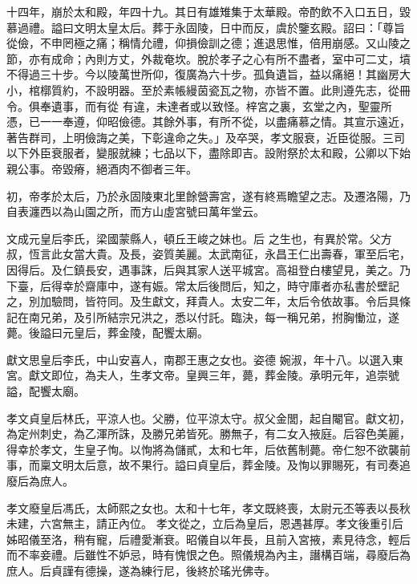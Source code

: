 \begin{pinyinscope}
 十四年，崩於太和殿，年四十九。其日有雄雉集于太華殿。帝酌飲不入口五日，毀慕過禮。謚曰文明太皇太后。葬于永固陵，日中而反，虞於鑒玄殿。詔曰：「尊旨從儉，不申罔極之痛；稱情允禮，仰損儉訓之德；進退思惟，倍用崩感。又山陵之節，亦有成命；內則方丈，外裁奄坎。脫於孝子之心有所不盡者，室中可二丈，墳不得過三十步。今以陵萬世所仰，復廣為六十步。孤負遺旨，益以痛絕！其幽房大小，棺槨質約，不設明器。至於素帳縵茵瓷瓦之物，亦皆不置。此則遵先志，從冊令。俱奉遺事，而有從
 有違，未達者或以致怪。梓宮之裏，玄堂之內，聖靈所憑，已一一奉遵，仰昭儉德。其餘外事，有所不從，以盡痛慕之情。其宣示遠近，著告群司，上明儉誨之美，下彰違命之失。」及卒哭，孝文服衰，近臣從服。三司以下外臣衰服者，變服就練；七品以下，盡除即吉。設附祭於太和殿，公卿以下始親公事。帝毀瘠，絕酒肉不御者三年。



 初，帝孝於太后，乃於永固陵東北里餘營壽宮，遂有終焉瞻望之志。及遷洛陽，乃自表瀍西以為山園之所，而方山虛宮號曰萬年堂云。



 文成元皇后李氏，梁國蒙縣人，頓丘王峻之妹也。后
 之生也，有異於常。父方叔，恆言此女當大貴。及長，姿質美麗。太武南征，永昌王仁出壽春，軍至后宅，因得后。及仁鎮長安，遇事誅，后與其家人送平城宮。高祖登白樓望見，美之。乃下臺，后得幸於齋庫中，遂有娠。常太后後問后，知之，時守庫者亦私書於壁記之，別加驗問，皆符同。及生獻文，拜貴人。太安二年，太后令依故事。令后具條記在南兄弟，及引所結宗兄洪之，悉以付託。臨決，每一稱兄弟，拊胸慟泣，遂薨。後謚曰元皇后，葬金陵，配饗太廟。



 獻文思皇后李氏，中山安喜人，南郡王惠之女也。姿德
 婉淑，年十八。以選入東宮。獻文即位，為夫人，生孝文帝。皇興三年，薨，葬金陵。承明元年，追崇號謚，配饗太廟。



 孝文貞皇后林氏，平涼人也。父勝，位平涼太守。叔父金閭，起自閹官。獻文初，為定州刺史，為乙渾所誅，及勝兄弟皆死。勝無子，有二女入掖庭。后容色美麗，得幸於孝文，生皇子恂。以恂將為儲貳，太和七年，后依舊制薨。帝仁恕不欲襲前事，而稟文明太后意，故不果行。謚曰貞皇后，葬金陵。及恂以罪賜死，有司奏追廢后為庶人。



 孝文廢皇后馮氏，太師熙之女也。太和十七年，孝文既終喪，太尉元丕等表以長秋未建，六宮無主，請正內位。
 孝文從之，立后為皇后，恩遇甚厚。孝文後重引后姊昭儀至洛，稍有寵，后禮愛漸衰。昭儀自以年長，且前入宮掖，素見待念，輕后而不率妾禮。后雖性不妒忌，時有愧恨之色。照儀規為內主，譖構百端，尋廢后為庶人。后貞謹有德操，遂為練行尼，後終於瑤光佛寺。




\end{pinyinscope}
